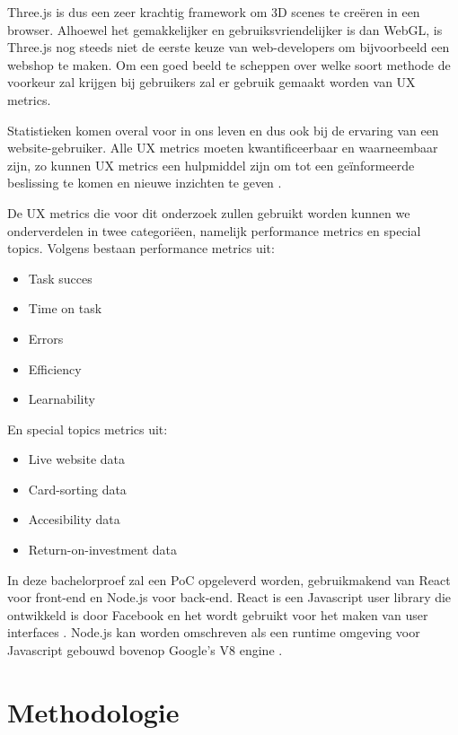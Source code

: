 Three.js is dus een zeer krachtig framework om 3D scenes te creëren in een browser. Alhoewel het gemakkelijker en gebruiksvriendelijker is dan WebGL, is Three.js nog steeds niet de eerste keuze van web-developers om bijvoorbeeld een webshop te maken. Om een goed beeld te scheppen over welke soort methode de voorkeur zal krijgen bij gebruikers zal er gebruik gemaakt worden van UX metrics.

Statistieken komen overal voor in ons leven en dus ook bij de ervaring van een website-gebruiker. Alle UX metrics moeten kwantificeerbaar en waarneembaar zijn, zo kunnen UX metrics een hulpmiddel zijn om tot een geïnformeerde beslissing te komen en nieuwe inzichten te geven \autocite{Albert2013}.

De UX metrics die voor dit onderzoek zullen gebruikt worden kunnen we onderverdelen in twee categoriëen, namelijk performance metrics en special topics. Volgens \textcite{Albert2013} bestaan performance metrics uit: \begin{itemize}
	\item Task succes
	\item Time on task
	\item Errors
	\item Efficiency
	\item Learnability
\end{itemize}
En special topics metrics uit:
\begin{itemize}
	\item Live website data
	\item Card-sorting data
	\item Accesibility data
	\item Return-on-investment data
\end{itemize}

In deze bachelorproef zal een PoC opgeleverd worden, gebruikmakend van React voor front-end en Node.js voor back-end. React is een Javascript user library die ontwikkeld is door Facebook en het wordt gebruikt voor het maken van user interfaces \autocite{Banks2017}. Node.js kan worden omschreven als een runtime omgeving voor Javascript gebouwd bovenop Google's V8 engine \autocite{Satheesh2015}.
\section{Methodologie}%
\label{sec:methodologie}

